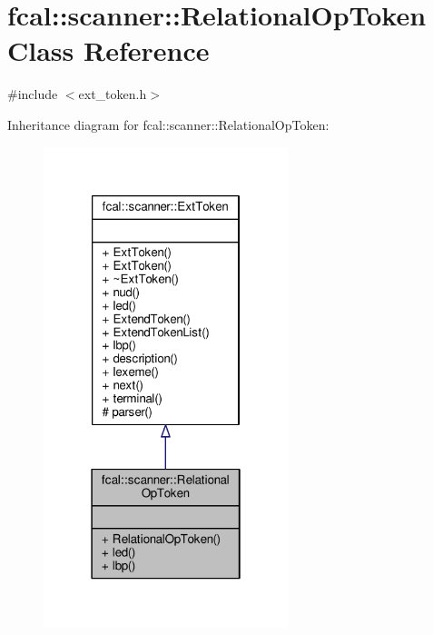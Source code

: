 \hypertarget{classfcal_1_1scanner_1_1RelationalOpToken}{}\section{fcal\+:\+:scanner\+:\+:Relational\+Op\+Token Class Reference}
\label{classfcal_1_1scanner_1_1RelationalOpToken}


{\ttfamily \#include $<$ext\+\_\+token.\+h$>$}



Inheritance diagram for fcal\+:\+:scanner\+:\+:Relational\+Op\+Token\+:
\nopagebreak
\begin{figure}[H]
\begin{center}
\leavevmode
\includegraphics[width=202pt]{classfcal_1_1scanner_1_1RelationalOpToken__inherit__graph}
\end{center}
\end{figure}


